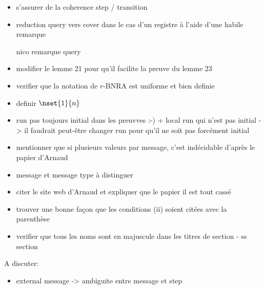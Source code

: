\begin{itemize}
	\item s'assurer de la coherence step / transition
    \item reduction query vers cover dans le cas d'un registre à l'aide d'une habile remarque
    \item[nico] remarque query 
    \item modifier le lemme 21 pour qu'il facilite la preuve du lemme 23
    \item verifier que la notation de $r$-BNRA est uniforme et bien definie
    \item definir $\nset{1}{n}$
    \item run pas toujours initial dans les preuvves :-) + local run qui n'est pas initial -> il faudrait peut-être changer run pour qu'il ne soit pas forcément initial
    \item mentionner que si plusieurs valeurs par message, c'est indécidable d'après le papier d'Arnaud
    \item message et message type à distinguer 
    \item citer le site web d'Arnaud et expliquer que le papier il est tout cassé
    \item trouver une bonne façon que les conditions (ii) soient citées avec la parenthèse
    \item verifier que tous les noms sont en majuscule dans les titres de section - ss section
\end{itemize}

A discuter:
\begin{itemize}
\item external message -> ambiguite entre message et step 
\end{itemize}